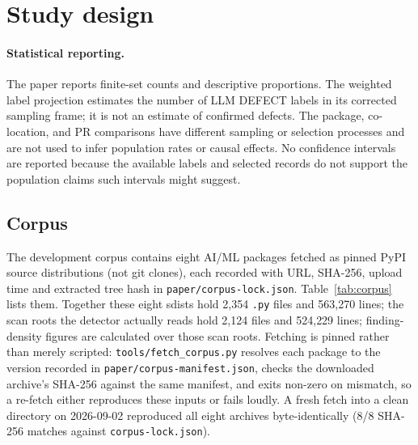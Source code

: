 \documentclass[10pt,a4paper]{article}
\begin{document}
\section{Study design}
\label{sec:study}

\paragraph{Statistical reporting.}
The paper reports finite-set counts and descriptive proportions. The weighted
label projection estimates the number of LLM DEFECT labels in its corrected
sampling frame; it is not an estimate of confirmed defects. The package,
co-location, and PR comparisons have different sampling or selection processes
and are not used to infer population rates or causal effects. No confidence
intervals are reported because the available labels and selected records do not
support the population claims such intervals might suggest.

\subsection{Corpus}
\label{sec:corpus}

The development corpus contains eight AI/ML packages fetched as pinned PyPI
source distributions (not git clones), each recorded with URL, SHA-256, upload
time and extracted tree hash in \texttt{paper/corpus-lock.json}.
Table~\ref{tab:corpus} lists them. Together these eight sdists hold 2{,}354 \texttt{.py} files and 563{,}270 lines; the scan roots the
detector actually reads hold 2{,}124 files and 524{,}229 lines; finding-density
figures are calculated over those scan roots. Fetching is pinned rather than
merely scripted: \texttt{tools/fetch\_corpus.py} resolves each package to the
version recorded in \texttt{paper/corpus-manifest.json}, checks the downloaded
archive's SHA-256 against the same manifest, and exits non-zero on mismatch, so a
re-fetch either reproduces these inputs or fails loudly. A fresh fetch into a
clean directory on 2026-09-02 reproduced all eight archives byte-identically (8/8
SHA-256 matches against \texttt{corpus-lock.json}).
\end{document}
